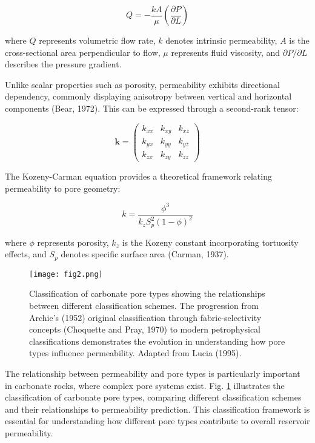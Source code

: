 \documentclass[journal]{IEEEtran}
\begin{document}
\begin{equation}
Q = -\frac{kA}{\mu} \left(\frac{\partial P}{\partial L}\right)
\end{equation}

\noindent where $Q$ represents volumetric flow rate, $k$ denotes intrinsic permeability, $A$ is the cross-sectional area perpendicular to flow, $\mu$ represents fluid viscosity, and $\partial P/\partial L$ describes the pressure gradient.

Unlike scalar properties such as porosity, permeability exhibits directional dependency, commonly displaying anisotropy between vertical and horizontal components (Bear, 1972). This can be expressed through a second-rank tensor:

\begin{equation}
\mathbf{k} = \begin{pmatrix}
k_{xx} & k_{xy} & k_{xz} \\
k_{yx} & k_{yy} & k_{yz} \\
k_{zx} & k_{zy} & k_{zz}
\end{pmatrix}
\end{equation}

The Kozeny-Carman equation provides a theoretical framework relating permeability to pore geometry:

\begin{equation}
k = \frac{\phi^3}{k_z S_p^2(1-\phi)^2}
\end{equation}

\noindent where $\phi$ represents porosity, $k_z$ is the Kozeny constant incorporating tortuosity effects, and $S_p$ denotes specific surface area (Carman, 1937).

\begin{figure}[t]
    \centering
    \texttt{[image: fig2.png]}
    \caption{Classification of carbonate pore types showing the relationships between different classification schemes. The progression from Archie's (1952) original classification through fabric-selectivity concepts (Choquette and Pray, 1970) to modern petrophysical classifications demonstrates the evolution in understanding how pore types influence permeability. Adapted from Lucia (1995).}
    \label{fig:pore_classification}
\end{figure}

The relationship between permeability and pore types is particularly important in carbonate rocks, where complex pore systems exist. Fig. \ref{fig:pore_classification} illustrates the classification of carbonate pore types, comparing different classification schemes and their relationships to permeability prediction. This classification framework is essential for understanding how different pore types contribute to overall reservoir permeability.
\end{document}
